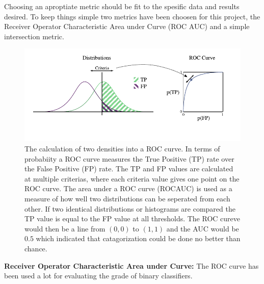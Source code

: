 \documentclass[altfont, fleqn]{uiophd}
\begin{document}
Choosing an aproptiate metric should be fit to the spesific data and results
desired. 
To keep things simple two metrics have been choosen for this project, 
the Receiver Operator Characteristic Area under Curve
(ROC AUC) and a simple intersection metric. 
\newline
\begin{figure}[h]
    \begin{center}
        \includegraphics[width=\textwidth]{images/sec_3/roc_curve.pdf}
        \caption{
            The calculation of two densities into a ROC curve. 
            In terms of probabiity 
            a ROC curve measures the True Positive (TP) rate over the
            False Positive (FP) rate. 
            The TP and FP values are calculated at multiple criterias, 
            where each criteria value gives one point on the ROC curve. 
            The area under a ROC curve (ROCAUC) is used as a measure of how well
            two distributions can be seperated from each other. 
            If two identical distributions or histograms are compared
            the TP value is equal to the FP value at all thresholds. 
            The ROC cureve would then be a line from $(0,0)$
            to $(1,1)$ and the AUC would be $0.5$ which indicated that
            catagorization could be done no better than chance.
        }
        \label{fig:3_roc_auc}
    \end{center}
\end{figure}

\noindent
{\bf Receiver Operator Characteristic Area under Curve:}
The ROC curve has been used a lot for evaluating the 
grade of binary classifiers. 
\newline 
\end{document}
